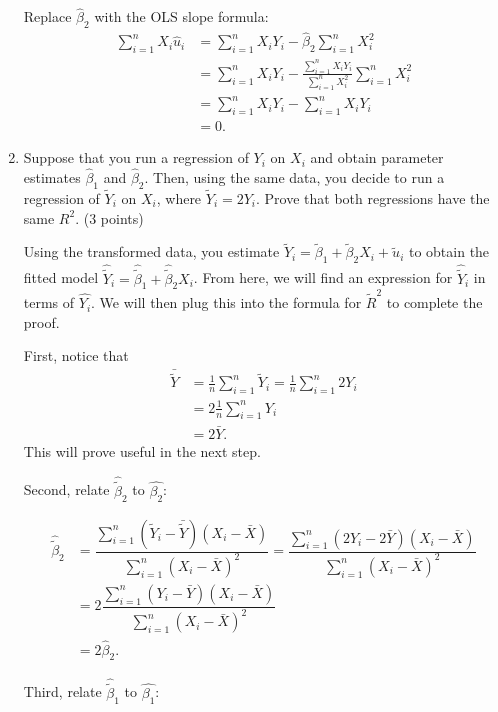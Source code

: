 \documentclass[11pt]{article}
\begin{document}
\begin{onehalfspacing}
\begin{enumerate}
{	Replace $\hat{\beta}_2$ with the OLS slope formula:
	\begin{align*}
	\sum_{i=1}^n X_i \hat{u}_i &= \sum_{i=1}^n X_i Y_i - \hat{\beta}_2 \sum_{i=1}^n X_i^2 \\
	&= \sum_{i=1}^n X_i Y_i - \frac{\sum_{i=1}^n X_i Y_i}{\sum_{i=1}^n X_i^2} \sum_{i=1}^n X_i^2 \\
	&= \sum_{i=1}^n X_i Y_i - \sum_{i=1}^n X_i Y_i \\
	&= 0.
	\end{align*}
	}

\item Suppose that you run a regression of $Y_i$ on $X_i$ and obtain parameter estimates $\hat{\beta}_1$ and $\hat{\beta}_2$. Then, using the same data, you decide to run a regression of $\tilde{Y}_i$ on $X_i$, where $\tilde{Y}_i = 2Y_i$. Prove that both regressions have the same $R^2$. (3 points)\\


{\color{pine_green} Using the transformed data, you estimate $\tilde{Y}_i = \tilde{\beta}_1 + \tilde{\beta}_2X_i + \tilde{u}_i$ to obtain the fitted model $\hat{\tilde{Y}}_i = \hat{\tilde{\beta}}_1 + \hat{\tilde{\beta}}_2X_i$. From here, we will find an expression for $\hat{\tilde{Y}}_i$ in terms of $\hat{Y_i}$. We will then plug this into the formula for $\tilde{R}^2$ to complete the proof.
	
	First, notice that
	\begin{align*}
	\bar{\tilde{Y}} &= \frac{1}{n} \sum_{i=1}^n \tilde{Y}_i = \frac{1}{n} \sum_{i=1}^n 2 Y_i \\ 
	&=  2 \frac{1}{n} \sum_{i=1}^n Y_i \\
	&= 2\bar{Y}.
	\end{align*}
	This will prove useful in the next step.
	
	Second, relate  $\hat{\tilde{\beta}}_2$ to $\hat{\beta_2}$:
	
	\begin{align*}
	\hat{\tilde{\beta}}_2 &= \dfrac{\sum_{i=1}^n (\tilde{Y}_i - \bar{\tilde{Y}})(X_i - \bar{X})}{\sum_{i=1}^n (X_i - \bar{X})^2} = \dfrac{\sum_{i=1}^n (2Y_i - 2\bar{Y})(X_i - \bar{X})}{\sum_{i=1}^n (X_i - \bar{X})^2} \\
	&= 2 \dfrac{\sum_{i=1}^n (Y_i - \bar{Y})(X_i - \bar{X})}{\sum_{i=1}^n (X_i - \bar{X})^2} \\
	&= 2 \hat{\beta}_2.
	\end{align*}
	
	Third, relate $\hat{\tilde{\beta}}_1$ to $\hat{\beta_1}$:
	
}
\end{enumerate}
\end{onehalfspacing}
\end{document}
